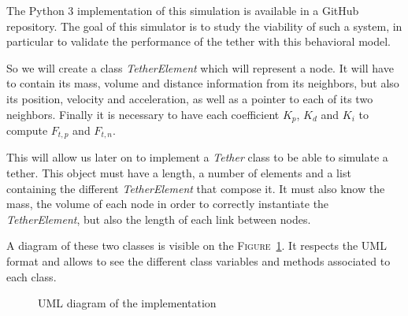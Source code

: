 The Python 3 implementation of this simulation is available in a GitHub repository. The goal of this simulator is to study the viability of such a system, in particular to validate the performance of the tether with this behavioral model.

So we will create a class \textit{TetherElement} which will represent a node. It will have to contain its mass, volume and distance information from its neighbors, but also its position, velocity and acceleration, as well as a pointer to each of its two neighbors. Finally it is necessary to have each coefficient $K_p$, $K_d$ and $K_i$ to compute $F_{t, p}$ and $F_{t, n}$.

This will allow us later on to implement a \textit{Tether} class to be able to simulate a tether. This object must have a length, a number of elements and a list containing the different \textit{TetherElement} that compose it. It must also know the mass, the volume of each node in order to correctly instantiate the \textit{TetherElement}, but also the length of each link between nodes.

A diagram of these two classes is visible on the \textsc{Figure}~\ref{fig:uml}. It respects the \textsc{UML} format and allows to see the different class variables and methods associated to each class.

\begin{figure}
    \centering
    \caption{UML diagram of the implementation}
    \label{fig:uml}
\end{figure}
